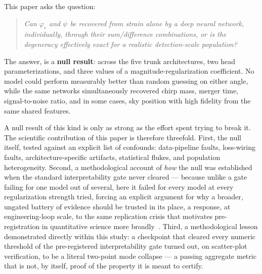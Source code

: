 This paper asks the question:
\begin{quote}
    \itshape Can $\varphi_c$ and $\psi$ be recovered from strain alone by a deep neural network, individually, through their sum/difference combinations, or is the degeneracy effectively exact for a realistic detection-scale population?
\end{quote}

The answer, is a \textbf{null result}: across the five trunk architectures, two head parameterizations, and three values of a magnitude-regularization coefficient.
No model could perform measurably better than random guessing on either angle, while the same networks simultaneously recovered chirp mass, merger time, signal-to-noise ratio, and in some cases, sky position with high fidelity from the same shared features.

A null result of this kind is only as strong as the effort spent trying to break it.
The scientific contribution of this paper is therefore threefold.
First, the null itself, tested against an explicit list of confounds: data-pipeline faults, loss-wiring faults, architecture-specific artifacts, statistical flukes, and population heterogeneity.
Second, a methodological account of \emph{how} the null was established when the standard interpretability gate never cleared --- because unlike a gate failing for one model out of several, here it failed for every model at every regularization strength tried, forcing an explicit argument for why a broader, ungated battery of evidence should be trusted in its place, a response, at engineering-loop scale, to the same replication crisis that motivates pre-registration in quantitative science more broadly~\citep{ioannidis2005false,nosek2018preregistration}.
Third, a methodological lesson demonstrated directly within this study: a checkpoint that cleared every numeric threshold of the pre-registered interpretability gate turned out, on scatter-plot verification, to be a literal two-point mode collapse --- a passing aggregate metric that is not, by itself, proof of the property it is meant to certify.


